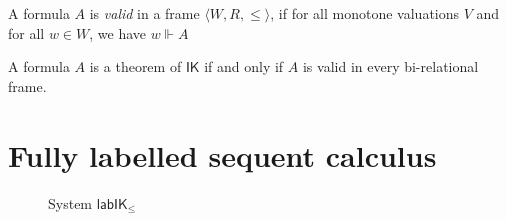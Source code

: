 \documentclass[twoside]{aiml20}
\newcommand*{\IK}{\mathsf{IK}}
\newcommand*{\lab}{\mathsf{lab}}
\newcommand*{\labIKp}{\lab\IK_{\le}}
\newcommand*{\lb}[1]{#1}%
\newcommand*{\fm}[1]{#1}%
\begin{document}
\begin{definition}
	A formula $\fm A$ is \emph{valid} in a frame $\langle W, R, \le \rangle$, if for all monotone valuations $V$ and for all $\lb w \in W$, we have $\lb w \Vdash \fm A$
\end{definition}


\begin{theorem}\label{thm:plotkin}
	A formula $\fm A$ is a theorem of $\IK$ if and only if $\fm A$ is valid in every bi-relational frame.
\end{theorem}




\section{Fully labelled sequent calculus}\label{sec:labelled}

\begin{figure}
	\centering
	\caption{System $\labIKp$}
	\label{fig:labIKp}
\end{figure}
\end{document}

